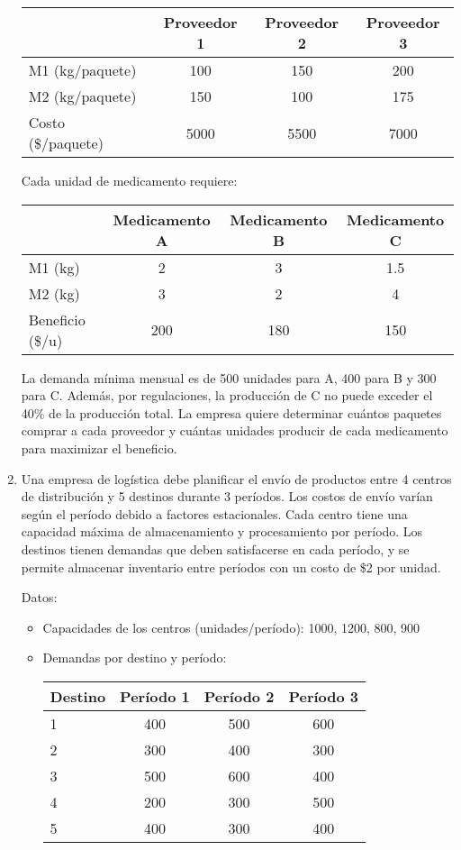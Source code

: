 \documentclass[12pt]{article}
\begin{document}
\begin{enumerate}
\begin{center}
\begin{tabular}{lccc}
\toprule
& Proveedor 1 & Proveedor 2 & Proveedor 3 \\
\midrule
M1 (kg/paquete) & 100 & 150 & 200 \\
M2 (kg/paquete) & 150 & 100 & 175 \\
Costo (\$/paquete) & 5000 & 5500 & 7000 \\
\bottomrule
\end{tabular}
\end{center}

Cada unidad de medicamento requiere:
\begin{center}
\begin{tabular}{lccc}
\toprule
& Medicamento A & Medicamento B & Medicamento C \\
\midrule
M1 (kg) & 2 & 3 & 1.5 \\
M2 (kg) & 3 & 2 & 4 \\
Beneficio (\$/u) & 200 & 180 & 150 \\
\bottomrule
\end{tabular}
\end{center}

La demanda mínima mensual es de 500 unidades para A, 400 para B y 300 para C. Además, por regulaciones, la producción de C no puede exceder el 40\% de la producción total. La empresa quiere determinar cuántos paquetes comprar a cada proveedor y cuántas unidades producir de cada medicamento para maximizar el beneficio.

\item Una empresa de logística debe planificar el envío de productos entre 4 centros de distribución y 5 destinos durante 3 períodos. Los costos de envío varían según el período debido a factores estacionales. Cada centro tiene una capacidad máxima de almacenamiento y procesamiento por período. Los destinos tienen demandas que deben satisfacerse en cada período, y se permite almacenar inventario entre períodos con un costo de \$2 por unidad.

Datos:
\begin{itemize}
\item Capacidades de los centros (unidades/período): 1000, 1200, 800, 900
\item Demandas por destino y período:

\begin{center}
\begin{tabular}{lccc}
\toprule
Destino & Período 1 & Período 2 & Período 3 \\
\midrule
1 & 400 & 500 & 600 \\
2 & 300 & 400 & 300 \\
3 & 500 & 600 & 400 \\
4 & 200 & 300 & 500 \\
5 & 400 & 300 & 400 \\
\bottomrule
\end{tabular}
\end{center}


\end{itemize}
\end{enumerate}
\end{document}
